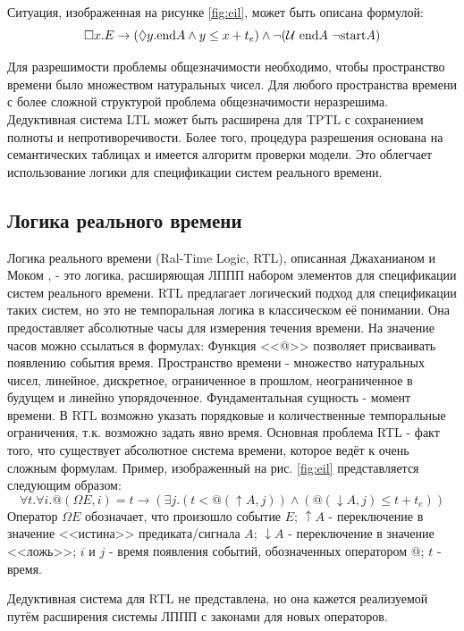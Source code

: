 		Ситуация, изображенная на рисунке \ref{fig:eil}, может быть описана формулой: \[\square x. E\rightarrow(\lozenge y. \text{end}A\land y \leq x+t_e) \land \neg (\mathcal{U} ~ \text{end}A ~ \neg \text{start} A) \]
		
		Для разрешимости проблемы общезначимости необходимо, чтобы пространство времени было множеством натуральных чисел. 
		Для любого пространства времени с более сложной структурой проблема общезначимости неразрешима.
		Дедуктивная система LTL может быть расширена для TPTL с сохранением полноты и непротиворечивости. 
		Более того, процедура разрешения основана на семантических таблицах и имеется алгоритм проверки модели.
		Это облегчает использование логики для спецификации систем реального времени.
		\subsection{Логика реального времени}
		 Логика реального времени (Ral-Time Logic, RTL), описанная Джаханианом и Моком \cite{RTL}, - это логика, расширяющая ЛППП набором элементов для спецификации систем реального времени.
		 RTL предлагает логический подход для спецификации таких систем, но это не темпоральная логика в классическом её понимании.
		 Она предоставляет абсолютные часы для измерения течения времени.
		 На значение часов можно ссылаться в формулах: Функция <<@>> позволяет присваивать появлению события время.
		 Пространство времени - множество натуральных чисел, линейное, дискретное, ограниченное в прошлом, неограниченное в будущем и линейно упорядоченное.
		 Фундаментальная сущность - момент времени.
		 В RTL возможно указать порядковые и количественные темпоральные ограничения, т.к. возможно задать явно время.
		 Основная проблема RTL - факт того, что существует абсолютное система времени, которое ведёт к очень сложным формулам.
		 Пример, изображенный на рис. \ref{fig:eil} представляется следующим образом:\[\forall t. \forall i. @(\Omega E, i) = t \rightarrow (\exists j.(t<@(\uparrow A,j)) \land (@(\downarrow A, j) \leq t+t_e)) \]
		 Оператор $ \Omega E $ обозначает, что произошло событие $ E $; $ \uparrow A$ -  переключение в значение <<истина>> предиката/сигнала $ A $; $ \downarrow A$ - переключение в значение <<ложь>>; $ i $ и $ j $ - время появления событий, обозначенных оператором $ @ $; $ t $ - время.
		 
		 Дедуктивная система для RTL не представлена, но она кажется реализуемой путём расширения системы ЛППП с законами для новых операторов.
		 
